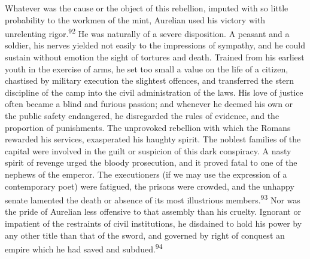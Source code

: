 

Whatever was the cause or the object of this rebellion, imputed
with so little probability to the workmen of the mint, Aurelian
used his victory with unrelenting rigor.\textsuperscript{92} He was naturally of a
severe disposition. A peasant and a soldier, his nerves yielded
not easily to the impressions of sympathy, and he could sustain
without emotion the sight of tortures and death. Trained from his
earliest youth in the exercise of arms, he set too small a value
on the life of a citizen, chastised by military execution the
slightest offences, and transferred the stern discipline of the
camp into the civil administration of the laws. His love of
justice often became a blind and furious passion; and whenever he
deemed his own or the public safety endangered, he disregarded
the rules of evidence, and the proportion of punishments. The
unprovoked rebellion with which the Romans rewarded his services,
exasperated his haughty spirit. The noblest families of the
capital were involved in the guilt or suspicion of this dark
conspiracy. A nasty spirit of revenge urged the bloody
prosecution, and it proved fatal to one of the nephews of the
emperor. The executioners (if we may use the expression of a
contemporary poet) were fatigued, the prisons were crowded, and
the unhappy senate lamented the death or absence of its most
illustrious members.\textsuperscript{93} Nor was the pride of Aurelian less
offensive to that assembly than his cruelty. Ignorant or
impatient of the restraints of civil institutions, he disdained
to hold his power by any other title than that of the sword, and
governed by right of conquest an empire which he had saved and
subdued.\textsuperscript{94}




